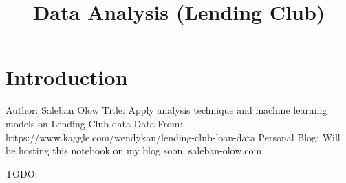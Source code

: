\documentclass[11pt]{article}
\title{Data Analysis (Lending Club)}
\begin{document}
    
    
    \maketitle
    
    

    
    \hypertarget{introduction}{%
\section{Introduction}\label{introduction}}

Author: Saleban Olow Title: Apply analysis technique and machine
learning models on Lending Club data Data From:
https://www.kaggle.com/wendykan/lending-club-loan-data Personal Blog:
Will be hosting this notebook on my blog soon, saleban-olow.com

TODO:
\end{document}
